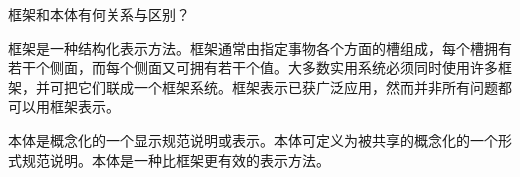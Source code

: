 \begin{question}
框架和本体有何关系与区别？
\end{question}
\begin{solution}
框架是一种结构化表示方法。框架通常由指定事物各个方面的槽组成，每个槽拥有若干个侧面，而每个侧面又可拥有若干个值。大多数实用系统必须同时使用许多框架，并可把它们联成一个框架系统。框架表示已获广泛应用，然而并非所有问题都可以用框架表示。\par
本体是概念化的一个显示规范说明或表示。本体可定义为被共享的概念化的一个形式规范说明。本体是一种比框架更有效的表示方法。
\end{solution}